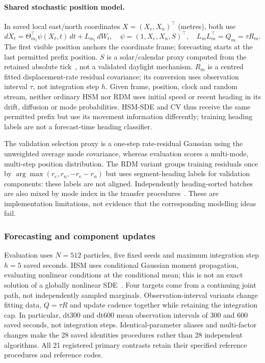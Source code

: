 \paragraph{Shared stochastic position model.}
In saved local east/north coordinates $X=(X_e,X_n)^\top$ (metres), both use
\begin{equation}\label{eq:ordinary-full}
 dX_t=\Theta_{m_t}^{\top}\psi(X_t,t)\,dt+L_{m_t}\,dW_t,
 \quad \psi=(1,X_e,X_n,S)^\top,\quad L_mL_m^\top=Q_m=\tau R_m.
\end{equation}
The first visible position anchors the coordinate frame; forecasting starts
at the last permitted prefix position. $S$ is a solar/calendar proxy computed
from the retained absolute tick~\cite{noaa}, not a validated daylight
mechanism. $R_m$ is a centred fitted displacement-rate residual covariance;
its conversion uses observation interval $\tau$, not integration step $h$.
Given frame, position, clock and random stream, neither ordinary HSM nor RDM
uses initial speed or recent heading in its drift, diffusion or mode probabilities.
HSM-SDE and CV thus receive the same permitted prefix but use its movement
information differently; training heading labels are not a forecast-time heading classifier.


The validation selection proxy is a one-step
rate-residual Gaussian using the unweighted average mode covariance, whereas
evaluation scores a multi-mode, multi-step position distribution. The RDM
variant groups training residuals once by $\arg\max(r_e,r_n,-r_e-r_n)$ but
uses segment-heading labels for validation components: these labels are not
aligned. Independently heading-sorted batches are also mixed by mode index
in the transfer procedures~\cite{nichol2018}. These are implementation
limitations, not evidence that the corresponding modelling ideas fail.

\subsubsection{Forecasting and component updates}\label{sec:forecast-methods}
Evaluation uses $N=512$ particles, five fixed seeds and maximum integration
step $h=5$ saved seconds. HSM uses conditional Gaussian moment propagation,
evaluating nonlinear conditions at the conditional mean; this is not an
exact solution of a globally nonlinear SDE~\cite{kloeden1992}. Four targets
come from a continuing joint path, not independently sampled marginals.
Observation-interval variants change fitting data, $Q=\tau R$ and update
cadence together while retaining the integration cap. In particular, dt300
and dt600 mean observation intervals of 300 and 600 saved seconds, not
integration steps. Identical-parameter aliases and multi-factor changes
make the 28 saved identities procedures rather than 28 independent algorithms.
All 21 registered primary contrasts retain their specified reference procedures and reference codes.


